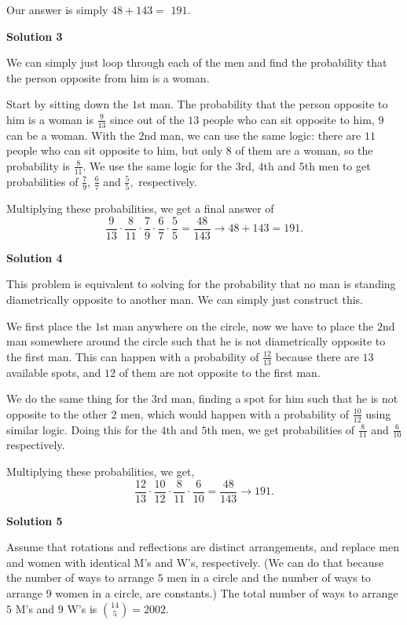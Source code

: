 \begin{enumerate}
 Our answer is simply \( 48 + 143 =\) $\boxed{191}.$




\textbf{Solution 3}

We can simply just loop through each of the men and find the probability that the person opposite from him is a woman.

 Start by sitting down the $1$st man. The probability that the person opposite to him is a woman is $\frac{9}{13}$ since out of the $13$ people who can sit opposite to him, $9$ can be a woman. With the $2$nd man, we can use the same logic: there are $11$ people who can sit opposite to him, but only $8$ of them are a woman, so the probability is $\frac{8}{11}.$ We use the same logic for the $3$rd, $4$th and $5$th men to get probabilities of $\frac{7}{9}$, $\frac{6}{7}$ and $\frac{5}{5},$ respectively.

 Multiplying these probabilities, we get a final answer of 
 \[\frac{9}{13}\cdot\frac{8}{11}\cdot\frac{7}{9}\cdot\frac{6}{7}\cdot\frac{5}{5}=\frac{48}{143}\longrightarrow 48+143 = \boxed{191}.\]




\textbf{Solution 4}

This problem is equivalent to solving for the probability that no man is standing diametrically opposite to another man. We can simply just construct this.

 We first place the $1$st man anywhere on the circle, now we have to place the $2$nd man somewhere around the circle such that he is not diametrically opposite to the first man. This can happen with a probability of $\frac{12}{13}$ because there are $13$ available spots, and $12$ of them are not opposite to the first man.

 We do the same thing for the $3$rd man, finding a spot for him such that he is not opposite to the other $2$ men, which would happen with a probability of $\frac{10}{12}$ using similar logic. Doing this for the $4$th and $5$th men, we get probabilities of $\frac{8}{11}$ and $\frac{6}{10}$ respectively.

 Multiplying these probabilities, we get, 
 \[\frac{12}{13}\cdot\frac{10}{12}\cdot\frac{8}{11}\cdot\frac{6}{10}=\frac{48}{143}\longrightarrow\boxed{191}.\]




\textbf{Solution 5}

Assume that rotations and reflections are distinct arrangements, and replace men and women with identical M's and W's, respectively. (We can do that because the number of ways to arrange $5$ men in a circle and the number of ways to arrange $9$ women in a circle, are constants.) The total number of ways to arrange $5$ M's and $9$ W's is $\binom{14}{5} = 2002.$ 


\end{enumerate}
